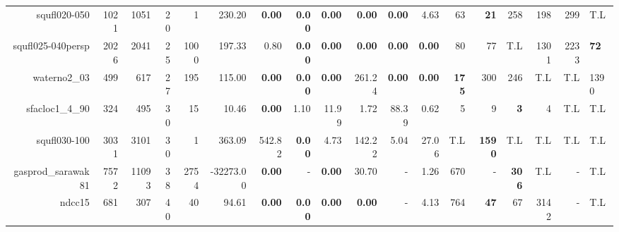\begin{table*}[t]
\begin{tabular}{|r|r|r|r|r||r||r|r|r|r|r||r|r|r|r|r|r|}
                      squfl020-050 &         1021 &          1051 &           20 &             1 &              230.20 &  \textbf{0.00} &  \textbf{0.00} & \textbf{0.00} &  \textbf{0.00} & \textbf{0.00} &          4.63 &                 63 &        \textbf{21} &                258 &                198 &          299 &          T.L \\ 
                 squfl025-040persp &         2026 &          2041 &           25 &          1000 &              197.33 &           0.80 &  \textbf{0.00} & \textbf{0.00} &  \textbf{0.00} & \textbf{0.00} & \textbf{0.00} &                 80 &                 77 &                T.L &               1301 &         2233 &  \textbf{72} \\ 
                      waterno2\_03 &          499 &           617 &           27 &           195 &              115.00 &  \textbf{0.00} &  \textbf{0.00} & \textbf{0.00} &         261.24 & \textbf{0.00} & \textbf{0.00} &       \textbf{175} &                300 &                246 &                T.L &          T.L &         1390 \\ 
                   sfacloc1\_4\_90 &          324 &           495 &           30 &            15 &               10.46 &  \textbf{0.00} &           1.10 &         11.99 &           1.72 &         88.39 &          0.62 &                  5 &                  9 &         \textbf{3} &                  4 &          T.L &          T.L \\ 
                      squfl030-100 &         3031 &          3101 &           30 &             1 &              363.09 &         542.82 &  \textbf{0.00} &          4.73 &         142.22 &          5.04 &         27.06 &                T.L &      \textbf{1590} &                T.L &                T.L &          T.L &          T.L \\ 
                gasprod\_sarawak81 &         7572 &         11093 &           38 &          2754 &           -32273.00 &  \textbf{0.00} &              - & \textbf{0.00} &          30.70 &             - &          1.26 &                670 &                  - &       \textbf{306} &                T.L &            - &          T.L \\ 
                            ndcc15 &          681 &           307 &           40 &            40 &               94.61 &  \textbf{0.00} &  \textbf{0.00} & \textbf{0.00} &  \textbf{0.00} &             - &          4.13 &                764 &        \textbf{47} &                 67 &               3142 &            - &          T.L \\ 

\end{tabular}
\end{table*}
